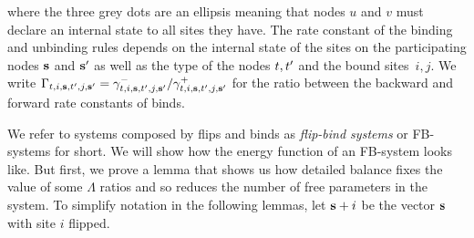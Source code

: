 where the three grey dots are an ellipsis
meaning that nodes $u$ and $v$ must declare
an internal state to all sites they have.
The rate constant of the binding and unbinding rules
depends on the internal state of the sites
on the participating nodes $\boldsymbol{\mathbf{s}}$ and $\boldsymbol{\mathbf{s}}'$
as well as the type of the nodes $t,t'$ and the bound sites~$i,j$.
We write $\Gamma_{t,i,\boldsymbol{\mathbf{s}},t',j,\boldsymbol{\mathbf{s}}'} =
\gamma^-_{t,i,\boldsymbol{\mathbf{s}},t',j,\boldsymbol{\mathbf{s}}'}/
\gamma^+_{t,i,\boldsymbol{\mathbf{s}},t',j,\boldsymbol{\mathbf{s}}'}$ for
the ratio between the backward and forward rate constants of binds.

We refer to systems composed by flips and binds
as \emph{flip-bind systems} or FB-systems for short.
We will show how the energy function of an FB-system looks like.
But first, we prove a lemma that shows us
how detailed balance fixes the value of some $\Lambda$ ratios
and so reduces the number of free parameters in the system.
To simplify notation in the following lemmas,
let $\boldsymbol{\mathbf{s}}+i$ be the vector $\boldsymbol{\mathbf{s}}$
with site $i$ flipped.

